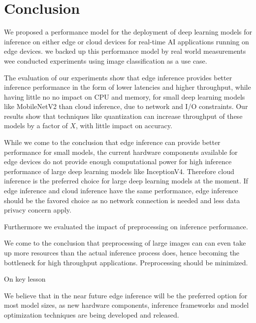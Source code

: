 \chapter{Conclusion}
\label{chap:conclusion}
%
We proposed a performance model for the deployment of deep learning models for inference on either edge or cloud devices for real-time AI applications running on edge devices.
we backed up this performance model by real world measurements wee conducted experiments using image classification as a use case.

The evaluation of our experiments show that edge inference provides better inference performance in the form of lower latencies and higher throughput, while having little no no impact on CPU and memory, for small deep learning models like MobileNetV2 than cloud inference, due to network and I/O constraints. 
Our results show that techniques like quantization can increase throughput of these models by a factor of $X$, with little impact on accuracy.

While we come to the conclusion that edge inference can provide better performance for small models, the current hardware components available for edge devices do not provide enough computational power for high inference performance of large deep learning models like InceptionV4.
Therefore cloud inference is the preferred choice for large deep learning models at the moment.
If edge inference and cloud inference have the same performance, edge inference should be the favored choice as no network connection is needed and less data privacy concern apply.



Furthermore we evaluated the impact of preprocessing on inference performance.



We come to the conclusion that preprocessing of large images can can even take up more resources than the actual inference process does, hence becoming the bottleneck for high throughput applications.
Preprocessing should be minimized.


On key lesson



We believe that in the near future edge inference will be the preferred option for most model sizes, as new hardware components, inference frameworks and model optimization techniques are being developed and released.
